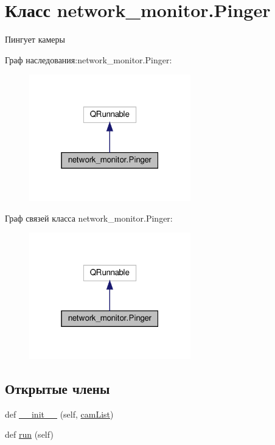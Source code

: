 \hypertarget{classnetwork__monitor_1_1_pinger}{}\section{Класс network\+\_\+monitor.\+Pinger}
\label{classnetwork__monitor_1_1_pinger}


Пингует камеры  




Граф наследования\+:network\+\_\+monitor.\+Pinger\+:\nopagebreak
\begin{figure}[H]
\begin{center}
\leavevmode
\includegraphics[width=199pt]{classnetwork__monitor_1_1_pinger__inherit__graph}
\end{center}
\end{figure}


Граф связей класса network\+\_\+monitor.\+Pinger\+:\nopagebreak
\begin{figure}[H]
\begin{center}
\leavevmode
\includegraphics[width=199pt]{classnetwork__monitor_1_1_pinger__coll__graph}
\end{center}
\end{figure}
\subsection*{Открытые члены}
\begin{DoxyCompactItemize}
\item 
def \hyperlink{classnetwork__monitor_1_1_pinger_aa24b595bfd313e99ec0e0e9bd2f648d0}{\+\_\+\+\_\+init\+\_\+\+\_\+} (self, \hyperlink{classnetwork__monitor_1_1_pinger_a9e16cc56e9483b16869dccd9b87045d9}{cam\+List})
\item 
def \hyperlink{classnetwork__monitor_1_1_pinger_aa316109fda2807e15b9edaa947f4a724}{run} (self)
\end{DoxyCompactItemize}

